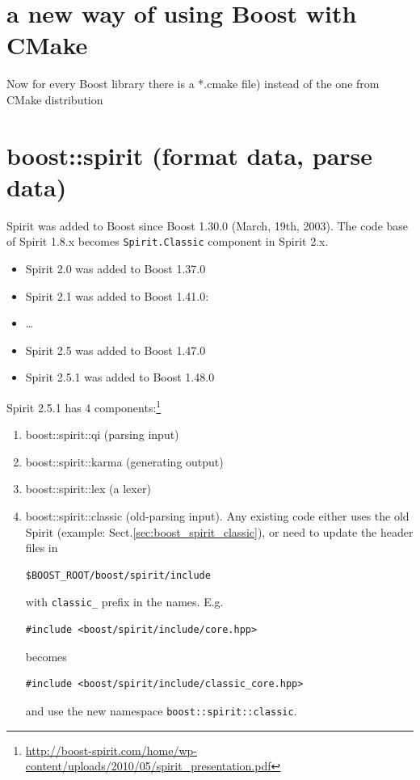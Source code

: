 \section{a new way of using Boost with CMake}


Now for every Boost library there is a *.cmake file) instead of the one from CMake distribution


\section{boost::spirit (format data, parse data)}
\label{sec:boost_spirit}


Spirit was added to Boost since Boost 1.30.0 (March, 19th, 2003). The code base
of Spirit 1.8.x becomes \verb!Spirit.Classic! component in Spirit 2.x. 
\begin{itemize}
  \item Spirit 2.0 was added to Boost 1.37.0
  \item Spirit 2.1 was added to Boost 1.41.0:
  \item \ldots 
  \item Spirit 2.5 was added to Boost 1.47.0
  \item Spirit 2.5.1 was added to Boost 1.48.0
\end{itemize}

Spirit 2.5.1 has 4
components:\footnote{\url{http://boost-spirit.com/home/wp-content/uploads/2010/05/spirit_presentation.pdf}}
\begin{enumerate}
  \item boost::spirit::qi    (parsing input)
  \item boost::spirit::karma (generating output)
  \item boost::spirit::lex   (a lexer)
  \item boost::spirit::classic (old-parsing input). Any
existing code either uses the old Spirit (example:
Sect.\ref{sec:boost_spirit_classic}), or need to update the header files in
\begin{verbatim}
$BOOST_ROOT/boost/spirit/include
\end{verbatim} 
with \verb!classic_! prefix in the
names. E.g. 
\begin{verbatim}
#include <boost/spirit/include/core.hpp>
\end{verbatim}
becomes 
\begin{verbatim}
#include <boost/spirit/include/classic_core.hpp>
\end{verbatim}
and use the new namespace \verb!boost::spirit::classic!.

\end{enumerate}

